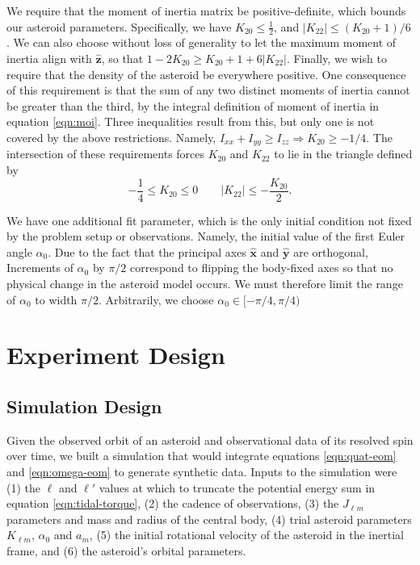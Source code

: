 \documentclass[linenumbers]{aastex631}
\newcommand{\unit}[1]{\hat{\mathbf{#1}}}
\begin{document}
We require that the moment of inertia matrix be positive-definite, which bounds our asteroid parameters. Specifically, we have $K_{20} \leq \frac{1}{2}$, and $|K_{22}| \leq (K_{20}+1)/6$. We can also choose without loss of generality to let the maximum moment of inertia align with $\unit z$, so that $1-2K_{20}\geq K_{20}+1+6|K_{22}|.$ Finally, we wish to require that the density of the asteroid be everywhere positive. One consequence of this requirement is that the sum of any two distinct moments of inertia cannot be greater than the third, by the integral definition of moment of inertia in equation \ref{eqn:moi}. Three inequalities result from this, but only one is not covered by the above restrictions. Namely, $I_{xx} + I_{yy}\geq I_{zz} \Rightarrow K_{20} \geq -1/4$. The intersection of these requirements forces $K_{20}$ and $K_{22}$ to lie in the triangle defined by
\begin{equation}
-\frac{1}{4} \leq K_{20} \leq 0 \qquad |K_{22}| \leq -\frac{K_{20}}{2}.
\label{eqn:parameter-bounds}
\end{equation}


We have one additional fit parameter, which is the only initial condition not fixed by the problem setup or observations. Namely, the initial value of the first Euler angle $\alpha_0$. Due to the fact that the principal axes $\unit x$ and $\unit y$ are orthogonal, Increments of $\alpha_0$ by $\pi/2$ correspond to flipping the body-fixed axes so that no physical change in the asteroid model occurs. We must therefore limit the range of $\alpha_0$ to width $\pi/2$. Arbitrarily, we choose $\alpha_0 \in [-\pi/4, \pi/4)$

\section{Experiment Design}
\subsection{Simulation Design}
\label{sec:simulation}
Given the observed orbit of an asteroid and observational data of its resolved spin over time, we built a simulation that would integrate equations \ref{eqn:quat-eom} and \ref{eqn:omega-eom} to generate synthetic data. Inputs to the simulation were (1) the $\ell$ and $\ell'$ values at which to truncate the potential energy sum in equation \ref{eqn:tidal-torque}, (2) the cadence of observations, (3) the $J_{\ell m}$ parameters and mass and radius of the central body, (4) trial asteroid parameters $K_{\ell m}$, $\alpha_0$ and $a_m$, (5) the initial rotational velocity of the asteroid in the inertial frame, and (6) the asteroid's orbital parameters.
\end{document}
